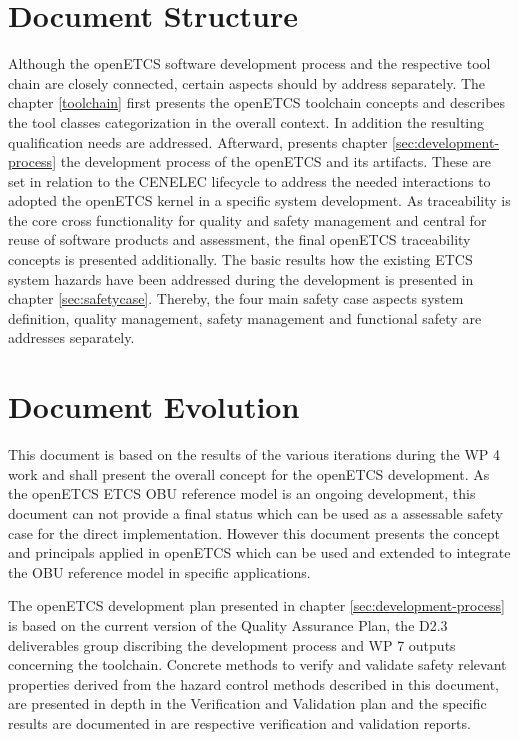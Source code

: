 \documentclass{template/openetcs_report}
\begin{document}
\section{Document Structure}
\label{sec:document-structure}

Although the openETCS software development process and the respective tool chain are closely connected, certain aspects should by address separately. The chapter \ref{toolchain} first presents the openETCS toolchain concepts and describes the tool classes categorization in the overall context. In addition the resulting qualification needs are addressed. Afterward, presents chapter \ref{sec:development-process} the development process of the openETCS and its artifacts. These are set in relation to the CENELEC lifecycle to address the needed interactions to adopted the openETCS kernel in a specific system development. As traceability is the core cross functionality for quality and safety management and central for reuse of software products and assessment, the final openETCS traceability concepts is presented additionally. The basic results how the existing ETCS system hazards have been addressed during the development is presented in chapter \ref{sec:safetycase}. Thereby, the four main safety case aspects system definition, quality management, safety management and functional safety are addresses separately.

\section{Document Evolution}

This document is based on the results of the various iterations during the WP 4 work and shall present the overall concept for the openETCS development. As the openETCS ETCS OBU reference model is an ongoing development, this document can not provide a final status which can be used as a assessable safety case for the direct implementation. However this document presents the concept and principals applied in openETCS which can be used and extended to integrate the OBU reference model in specific applications.

The openETCS development plan presented in chapter \ref{sec:development-process} is based on the current version of the Quality Assurance Plan, the D2.3 deliverables group discribing the development process and WP 7 outputs concerning the toolchain. Concrete methods to verify and validate safety relevant properties derived from the hazard control methods described in this document, are presented in depth   in the Verification and Validation plan and the specific results are documented in are respective verification and validation reports.
\end{document}
